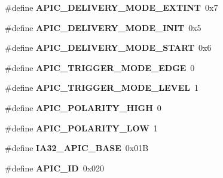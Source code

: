 \begin{DoxyCompactItemize}
\item 
\#define {\bfseries A\+P\+I\+C\+\_\+\+D\+E\+L\+I\+V\+E\+R\+Y\+\_\+\+M\+O\+D\+E\+\_\+\+E\+X\+T\+I\+NT}~0x7\hypertarget{group__apic__driver_ga7ebf9722743353e35d34e85d453deade}{}\label{group__apic__driver_ga7ebf9722743353e35d34e85d453deade}

\item 
\#define {\bfseries A\+P\+I\+C\+\_\+\+D\+E\+L\+I\+V\+E\+R\+Y\+\_\+\+M\+O\+D\+E\+\_\+\+I\+N\+IT}~0x5\hypertarget{group__apic__driver_ga8ec0e56a48bdea0db1b5594cae8c8ba3}{}\label{group__apic__driver_ga8ec0e56a48bdea0db1b5594cae8c8ba3}

\item 
\#define {\bfseries A\+P\+I\+C\+\_\+\+D\+E\+L\+I\+V\+E\+R\+Y\+\_\+\+M\+O\+D\+E\+\_\+\+S\+T\+A\+RT}~0x6\hypertarget{group__apic__driver_ga8075aa58a51257e16b9b59185fe4fc81}{}\label{group__apic__driver_ga8075aa58a51257e16b9b59185fe4fc81}

\item 
\#define {\bfseries A\+P\+I\+C\+\_\+\+T\+R\+I\+G\+G\+E\+R\+\_\+\+M\+O\+D\+E\+\_\+\+E\+D\+GE}~0\hypertarget{group__apic__driver_ga9687037fa8219d0ff56a496e025e2913}{}\label{group__apic__driver_ga9687037fa8219d0ff56a496e025e2913}

\item 
\#define {\bfseries A\+P\+I\+C\+\_\+\+T\+R\+I\+G\+G\+E\+R\+\_\+\+M\+O\+D\+E\+\_\+\+L\+E\+V\+EL}~1\hypertarget{group__apic__driver_gaab1d6c8964afaef52960d0865b78c365}{}\label{group__apic__driver_gaab1d6c8964afaef52960d0865b78c365}

\item 
\#define {\bfseries A\+P\+I\+C\+\_\+\+P\+O\+L\+A\+R\+I\+T\+Y\+\_\+\+H\+I\+GH}~0\hypertarget{group__apic__driver_gaed94897fcbda69fa8e1c5b620179dfd8}{}\label{group__apic__driver_gaed94897fcbda69fa8e1c5b620179dfd8}

\item 
\#define {\bfseries A\+P\+I\+C\+\_\+\+P\+O\+L\+A\+R\+I\+T\+Y\+\_\+\+L\+OW}~1\hypertarget{group__apic__driver_ga512e94b15da0de14250917c6d5f300a2}{}\label{group__apic__driver_ga512e94b15da0de14250917c6d5f300a2}

\item 
\#define {\bfseries I\+A32\+\_\+\+A\+P\+I\+C\+\_\+\+B\+A\+SE}~0x01B\hypertarget{group__apic__driver_ga160afc66daeb37e1ed812565695e67a7}{}\label{group__apic__driver_ga160afc66daeb37e1ed812565695e67a7}

\item 
\#define {\bfseries A\+P\+I\+C\+\_\+\+ID}~0x020\hypertarget{group__apic__driver_gad97a7d2b89d63e06c3e5e9e081dd9194}{}\label{group__apic__driver_gad97a7d2b89d63e06c3e5e9e081dd9194}


\end{DoxyCompactItemize}
